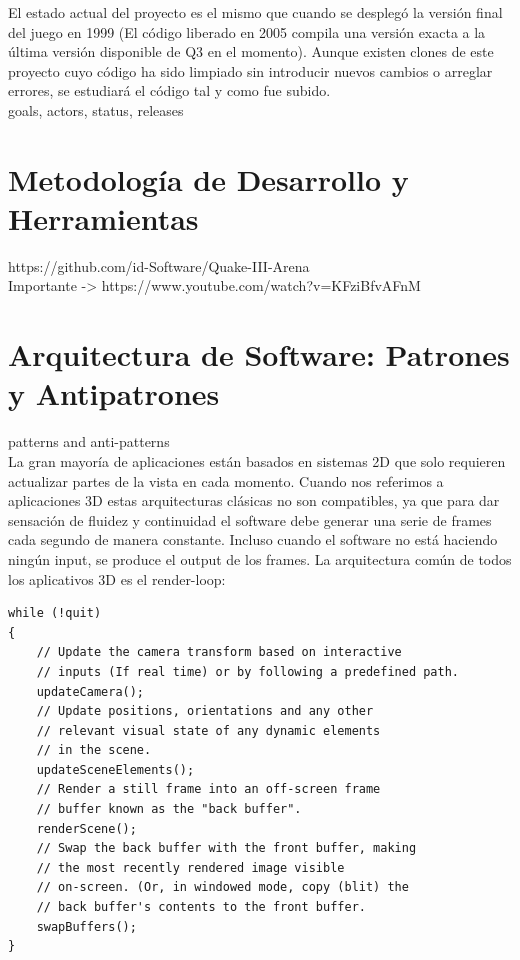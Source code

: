 \documentclass[a4paper,12pt]{report}
\begin{document}
	El estado actual del proyecto es el mismo que cuando se desplegó la versión final del juego en 1999 (El código liberado en 2005 compila una versión exacta a la última versión disponible de Q3 en el momento). Aunque existen clones de este proyecto cuyo código ha sido limpiado sin introducir nuevos cambios o arreglar errores, se estudiará el código tal y como fue subido.\\
	
	goals, actors, status, releases \cite{example}\\
	
	\section{Metodología de Desarrollo y Herramientas}
	https://github.com/id-Software/Quake-III-Arena\\
	Importante -> https://www.youtube.com/watch?v=KFziBfvAFnM\\
	
	\section{Arquitectura de Software: Patrones y Antipatrones}
	patterns and anti-patterns\\
	La gran mayoría de aplicaciones están basados en sistemas 2D que solo requieren actualizar partes de la vista en cada momento. Cuando nos referimos a aplicaciones 3D estas arquitecturas clásicas no son compatibles, ya que para dar sensación de fluidez y continuidad el software debe generar una serie de frames cada segundo de manera constante. Incluso cuando el software no está haciendo ningún input, se produce el output de los frames. La arquitectura común de todos los aplicativos 3D es el render-loop:
	
	\begin{lstlisting}[style=C, numbers=none]
while (!quit)
{
	// Update the camera transform based on interactive
	// inputs (If real time) or by following a predefined path.
	updateCamera();
	// Update positions, orientations and any other
	// relevant visual state of any dynamic elements
	// in the scene.
	updateSceneElements();
	// Render a still frame into an off-screen frame
	// buffer known as the "back buffer".
	renderScene();
	// Swap the back buffer with the front buffer, making
	// the most recently rendered image visible
	// on-screen. (Or, in windowed mode, copy (blit) the
	// back buffer's contents to the front buffer.
	swapBuffers();
}
\end{lstlisting}
	
\end{document}

